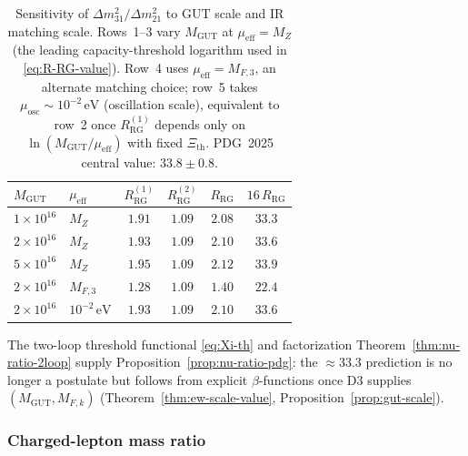 \begin{table}[ht]
\centering
\small
\renewcommand{\arraystretch}{1.1}
\begin{tabular}{@{}llcccc@{}}
\toprule
$M_{\mathrm{GUT}}$ &
$\mu_{\mathrm{eff}}$ &
$R_{\mathrm{RG}}^{(1)}$ &
$R_{\mathrm{RG}}^{(2)}$ &
$R_{\mathrm{RG}}$ &
$16\,R_{\mathrm{RG}}$ \\
\midrule
$1\times 10^{16}$ & $M_Z$ & $1.91$ & $1.09$ & $2.08$ & $33.3$ \\
$2\times 10^{16}$ & $M_Z$ & $1.93$ & $1.09$ & $2.10$ & $33.6$ \\
$5\times 10^{16}$ & $M_Z$ & $1.95$ & $1.09$ & $2.12$ & $33.9$ \\
$2\times 10^{16}$ & $M_{F,3}$ & $1.28$ & $1.09$ & $1.40$ & $22.4$ \\
$2\times 10^{16}$ & $10^{-2}\,\mathrm{eV}$ & $1.93$ & $1.09$ & $2.10$ & $33.6$ \\
\bottomrule
\end{tabular}
\caption{Sensitivity of $\Delta m^2_{31}/\Delta m^2_{21}$ to GUT scale and IR
matching scale. Rows~1--3 vary $M_{\mathrm{GUT}}$ at $\mu_{\mathrm{eff}}=M_Z$
(the leading capacity-threshold logarithm used in \eqref{eq:R-RG-value}).
Row~4 uses $\mu_{\mathrm{eff}}=M_{F,3}$, an alternate matching choice;
row~5 takes $\mu_{\mathrm{osc}}\sim 10^{-2}\,\mathrm{eV}$
(oscillation scale), equivalent to row~2 once $R_{\mathrm{RG}}^{(1)}$ depends
only on $\ln(M_{\mathrm{GUT}}/\mu_{\mathrm{eff}})$ with fixed
$\Xi_{\mathrm{th}}$. PDG~2025 central value: $33.8\pm 0.8$.}
\label{tab:nu-ratio-sensitivity}
\end{table}

\begin{remark}
The two-loop threshold functional \eqref{eq:Xi-th} and factorization
Theorem~\ref{thm:nu-ratio-2loop} supply Proposition~\ref{prop:nu-ratio-pdg}:
the $\approx 33.3$ prediction is no longer a postulate but follows from
explicit $\beta$-functions once D3 supplies $(M_{\mathrm{GUT}},M_{F,k})$
(Theorem~\ref{thm:ew-scale-value}, Proposition~\ref{prop:gut-scale}).
\end{remark}

\subsubsection{Charged-lepton mass ratio}

